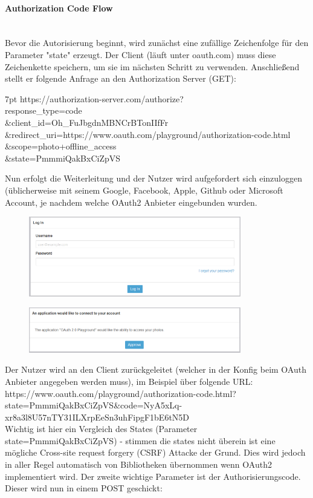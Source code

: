 \documentclass[notitlepage, hidelinks]{article}
\newenvironment{formal}{%
  \def\FrameCommand{%
    \hspace{1pt}%
    {\color{black}\vrule width 2pt}%
    {\color{formalshade}\vrule width 4pt}%
    \colorbox{formalshade}%
  }%
  \MakeFramed{\advance\hsize-\width\FrameRestore}%
  \noindent\hspace{-4.55pt}%
  \begin{adjustwidth}{}{7pt}%
  \vspace{2pt}\vspace{2pt}%
}
{%
  \vspace{2pt}\end{adjustwidth}\endMakeFramed%
}
\begin{document}
\paragraph{Authorization Code Flow} \mbox{} \\
Bevor die Autorisierung beginnt, wird zunächst eine zufällige Zeichenfolge für den Parameter "state" erzeugt. Der Client (läuft unter oauth.com) muss diese Zeichenkette speichern, um sie im nächsten Schritt zu verwenden. Anschließend stellt er folgende Anfrage an den Authorization Server (GET):

\begin{formal}https://authorization-server.com/authorize?\\
  response\_type=code\\
  \&client\_id=Oh\_FuJbgdnMBNCrBTonIIfFr\\
  \&redirect\_uri=https://www.oauth.com/playground/authorization-code.html\\
  \&scope=photo+offline\_access\\
  \&state=PmmmiQakBxCiZpVS
  \end{formal}

Nun erfolgt die Weiterleitung und der Nutzer wird aufgefordert sich einzuloggen (üblicherweise mit seinem Google, Facebook, Apple, Github oder Microsoft Account, je nachdem welche OAuth2 Anbieter eingebunden wurden.
 
\begin{figure}[H]
\centering
  \includegraphics[width=350px]{images/oauthex1.png}
  \caption{}
  \label{}
\end{figure}

\begin{figure}[H]
\centering
  \includegraphics[width=350px]{images/oauthex2.png}
  \caption{}
  \label{}
\end{figure}

Der Nutzer wird an den Client zurückgeleitet (welcher in der Konfig beim OAuth Anbieter angegeben werden muss), im Beispiel über folgende URL: https://www.oauth.com/playground/authorization-code.html?state=PmmmiQakBxCiZpVS\&code=NyA5xLq-xr8a3l8U57nTY31ILXrpEeSn3uhFipgF1bE6tN5D \\
Wichtig ist hier ein Vergleich des States (Parameter state=PmmmiQakBxCiZpVS) - stimmen die states nicht überein ist eine mögliche Cross-site request forgery (CSRF) Attacke der Grund. Dies wird jedoch in aller Regel automatisch von Bibliotheken übernommen wenn OAuth2 implementiert wird. Der zweite wichtige Parameter ist der Authorisierungscode. Dieser wird nun in einem POST geschickt:
\end{document}
